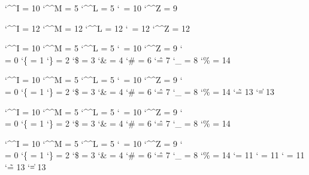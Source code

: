 
\startcatcodetable \nilcatcodes
    \catcode`\^^I = 10 %
    \catcode`\^^M =  5 %
    \catcode`\^^L =  5 %
    \catcode`\    = 10 %
    \catcode`\^^Z =  9 %
\stopcatcodetable

\startcatcodetable \vrbcatcodes %
    \catcode`\^^I = 12
    \catcode`\^^M = 12
    \catcode`\^^L = 12
    \catcode`\    = 12
    \catcode`\^^Z = 12
\stopcatcodetable

\startcatcodetable \texcatcodes
    \catcode`\^^I = 10
    \catcode`\^^M =  5
    \catcode`\^^L =  5
    \catcode`\    = 10
    \catcode`\^^Z =  9
    \catcode`\\   =  0
    \catcode`\{   =  1
    \catcode`\}   =  2
    \catcode`\$   =  3
    \catcode`\&   =  4
    \catcode`\#   =  6
    \catcode`\^   =  7
    \catcode`\_   =  8
    \catcode`\%   = 14
\stopcatcodetable

\startcatcodetable \ctxcatcodes
    \catcode`\^^I = 10
    \catcode`\^^M =  5
    \catcode`\^^L =  5
    \catcode`\    = 10
    \catcode`\^^Z =  9
    \catcode`\\   =  0
    \catcode`\{   =  1
    \catcode`\}   =  2
    \catcode`\$   =  3
    \catcode`\&   =  4
    \catcode`\#   =  6
    \catcode`\^   =  7
    \catcode`\_   =  8
    \catcode`\%   = 14
    \catcode`\~   = 13
    \catcode`\|   = 13
\stopcatcodetable

\startcatcodetable \mthcatcodes
    \catcode`\^^I = 10
    \catcode`\^^M =  5
    \catcode`\^^L =  5
    \catcode`\    = 10
    \catcode`\^^Z =  9
    \catcode`\\   =  0
    \catcode`\{   =  1
    \catcode`\}   =  2
    \catcode`\$   =  3
    \catcode`\&   =  4
    \catcode`\#   =  6
    \catcode`\^   =  7
    \catcode`\_   =  8
    \catcode`\%   = 14
\stopcatcodetable

\startcatcodetable \prtcatcodes
    \catcode`\^^I = 10
    \catcode`\^^M =  5
    \catcode`\^^L =  5
    \catcode`\    = 10
    \catcode`\^^Z =  9
    \catcode`\\   =  0
    \catcode`\{   =  1
    \catcode`\}   =  2
    \catcode`\$   =  3
    \catcode`\&   =  4
    \catcode`\#   =  6
    \catcode`\^   =  7
    \catcode`\_   =  8
    \catcode`\%   = 14
    \catcode`\@   = 11
    \catcode`\!   = 11
    \catcode`\?   = 11
    \catcode`\~   = 13
    \catcode`\|   = 13
\stopcatcodetable

